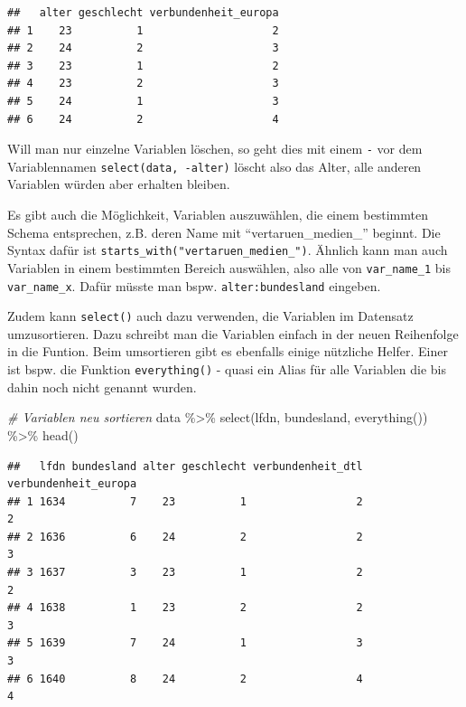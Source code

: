 \documentclass[
]{book}
\newenvironment{Shaded}{\begin{snugshade}}{\end{snugshade}}
\newcommand{\CommentTok}[1]{\textcolor[rgb]{0.56,0.35,0.01}{\textit{#1}}}
\newcommand{\FunctionTok}[1]{\textcolor[rgb]{0.00,0.00,0.00}{#1}}
\newcommand{\NormalTok}[1]{#1}
\newcommand{\SpecialCharTok}[1]{\textcolor[rgb]{0.00,0.00,0.00}{#1}}
\begin{document}
\begin{verbatim}
##   alter geschlecht verbundenheit_europa
## 1    23          1                    2
## 2    24          2                    3
## 3    23          1                    2
## 4    23          2                    3
## 5    24          1                    3
## 6    24          2                    4
\end{verbatim}

Will man nur einzelne Variablen löschen, so geht dies mit einem \texttt{-} vor dem Variablennamen \texttt{select(data,\ -alter)} löscht also das Alter, alle anderen Variablen würden aber erhalten bleiben.

Es gibt auch die Möglichkeit, Variablen auszuwählen, die einem bestimmten Schema entsprechen, z.B. deren Name mit ``vertaruen\_medien\_'' beginnt. Die Syntax dafür ist \texttt{starts\_with("vertaruen\_medien\_")}. Ähnlich kann man auch Variablen in einem bestimmten Bereich auswählen, also alle von \texttt{var\_name\_1} bis \texttt{var\_name\_x}. Dafür müsste man bspw. \texttt{alter:bundesland} eingeben.

Zudem kann \texttt{select()} auch dazu verwenden, die Variablen im Datensatz umzusortieren. Dazu schreibt man die Variablen einfach in der neuen Reihenfolge in die Funtion. Beim umsortieren gibt es ebenfalls einige nützliche Helfer. Einer ist bspw. die Funktion \texttt{everything()} - quasi ein Alias für alle Variablen die bis dahin noch nicht genannt wurden.

\begin{Shaded}
\begin{Highlighting}[]
\CommentTok{\# Variablen neu sortieren}
\NormalTok{data }\SpecialCharTok{\%\textgreater{}\%} 
  \FunctionTok{select}\NormalTok{(lfdn, bundesland, }\FunctionTok{everything}\NormalTok{()) }\SpecialCharTok{\%\textgreater{}\%} 
  \FunctionTok{head}\NormalTok{()}
\end{Highlighting}
\end{Shaded}

\begin{verbatim}
##   lfdn bundesland alter geschlecht verbundenheit_dtl verbundenheit_europa
## 1 1634          7    23          1                 2                    2
## 2 1636          6    24          2                 2                    3
## 3 1637          3    23          1                 2                    2
## 4 1638          1    23          2                 2                    3
## 5 1639          7    24          1                 3                    3
## 6 1640          8    24          2                 4                    4
\end{verbatim}
\end{document}
